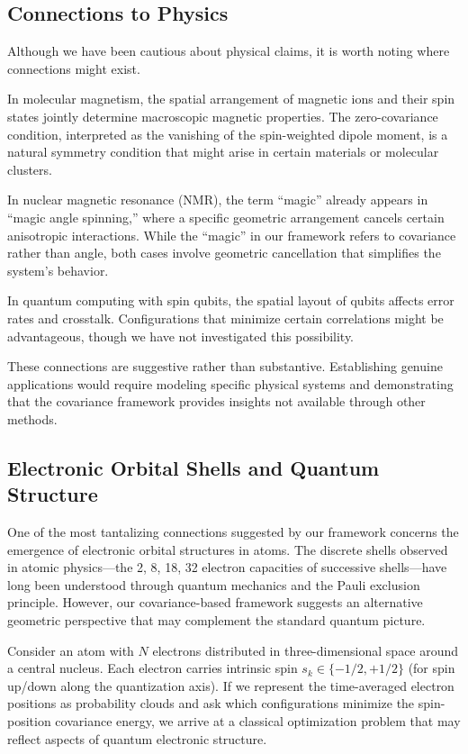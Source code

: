 \subsection{Connections to Physics}

Although we have been cautious about physical claims, it is worth noting where connections might exist.

In molecular magnetism, the spatial arrangement of magnetic ions and their spin states jointly determine macroscopic magnetic properties. The zero-covariance condition, interpreted as the vanishing of the spin-weighted dipole moment, is a natural symmetry condition that might arise in certain materials or molecular clusters.

In nuclear magnetic resonance (NMR), the term ``magic'' already appears in ``magic angle spinning,'' where a specific geometric arrangement cancels certain anisotropic interactions. While the ``magic'' in our framework refers to covariance rather than angle, both cases involve geometric cancellation that simplifies the system's behavior.

In quantum computing with spin qubits, the spatial layout of qubits affects error rates and crosstalk. Configurations that minimize certain correlations might be advantageous, though we have not investigated this possibility.

These connections are suggestive rather than substantive. Establishing genuine applications would require modeling specific physical systems and demonstrating that the covariance framework provides insights not available through other methods.

\subsection{Electronic Orbital Shells and Quantum Structure}

One of the most tantalizing connections suggested by our framework concerns the emergence of electronic orbital structures in atoms. The discrete shells observed in atomic physics---the 2, 8, 18, 32 electron capacities of successive shells---have long been understood through quantum mechanics and the Pauli exclusion principle. However, our covariance-based framework suggests an alternative geometric perspective that may complement the standard quantum picture.

Consider an atom with $N$ electrons distributed in three-dimensional space around a central nucleus. Each electron carries intrinsic spin $s_k \in \{-1/2, +1/2\}$ (for spin up/down along the quantization axis). If we represent the time-averaged electron positions as probability clouds and ask which configurations minimize the spin-position covariance energy, we arrive at a classical optimization problem that may reflect aspects of quantum electronic structure.

